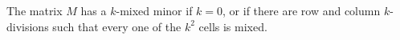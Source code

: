 The matrix \(M\) has a \(k\)-mixed minor if \(k=0\), or if there are row and
column \(k\)-divisions such that every one of the \(k^2\) cells is mixed.
